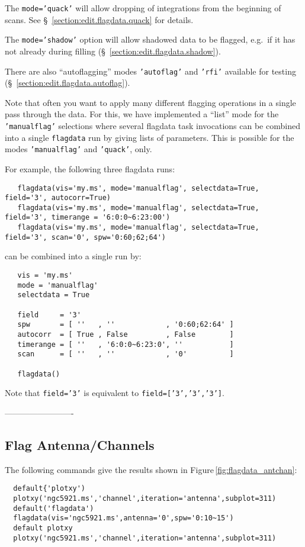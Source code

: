 The {\tt mode='quack'} will allow dropping of integrations from the
beginning of scans.  See \S~\ref{section:edit.flagdata.quack} for
details.

The {\tt mode='shadow'} option will allow shadowed data to be flagged,
e.g.\ if it has not already during filling 
(\S~\ref{section:edit.flagdata.shadow}).

There are also ``autoflagging'' modes {\tt'autoflag'} and {\tt'rfi'} 
available for testing (\S~\ref{section:edit.flagdata.autoflag}).

Note that often you want to apply many different flagging operations
in a single pass through the data.  For this, we have implemented
a ``list'' mode for the {\tt 'manualflag'} selections where
several flagdata task invocations can be combined into a single
{\tt flagdata} run by giving lists of parameters. 
This is possible for the modes {\tt 'manualflag'} and {\tt 'quack'}, only.
    
For example, the following three flagdata runs:
\small
\begin{verbatim}
   flagdata(vis='my.ms', mode='manualflag', selectdata=True, field='3', autocorr=True)
   flagdata(vis='my.ms', mode='manualflag', selectdata=True, field='3', timerange = '6:0:0~6:23:00')
   flagdata(vis='my.ms', mode='manualflag', selectdata=True, field='3', scan='0', spw='0:60;62;64')
\end{verbatim}
\normalsize
can be combined into a single run by:
\small
\begin{verbatim}
   vis = 'my.ms'
   mode = 'manualflag'
   selectdata = True
   
   field     = '3'
   spw       = [ ''   , ''            , '0:60;62:64' ]
   autocorr  = [ True , False         , False        ]
   timerange = [ ''   , '6:0:0~6:23:0', ''           ]
   scan      = [ ''   , ''            , '0'          ]
   
   flagdata()
\end{verbatim}
\normalsize
Note that {\tt field='3'} is equivalent to {\tt field=['3','3','3']}.

-------------------------
\subsection{Flag Antenna/Channels}
\label{section:edit.flagdata.ant}

The following commands give the results shown in 
Figure\,\ref{fig:flagdata_antchan}:
\small
\begin{verbatim}
  default{'plotxy')
  plotxy('ngc5921.ms','channel',iteration='antenna',subplot=311)
  default('flagdata')
  flagdata(vis='ngc5921.ms',antenna='0',spw='0:10~15')
  default plotxy
  plotxy('ngc5921.ms','channel',iteration='antenna',subplot=311)
\end{verbatim}
\normalsize

